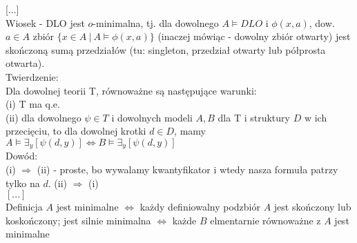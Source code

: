 \documentclass{article}
\begin{document}
[...]\\

Wiosek - DLO jest $o$-minimalna, tj. dla dowolnego $A\models DLO$ i $\phi(x,a)$, dow. $a\in A$ zbiór $\{x\in A\ |\ A\models \phi(x,a)\}$ (inaczej mówiąc - dowolny zbiór otwarty) jest skończoną sumą przedziałów (tu: singleton, przedział otwarty lub półprosta otwarta).
\\



Twierdzenie:\\
Dla dowolnej teorii T, równoważne są następujące warunki:\\
(i) T ma q.e.\\
(ii) dla dowolnego $\psi\in T$ i dowolnych modeli $A,B$ dla T i struktury $D$ w ich przecięciu, to dla dowolnej krotki $d\in D$, mamy $A\models\exists_{y}[\psi(d, y)]\iff B\models\exists_{y}[\psi(d, y)]$\\

Dowód:\\
(i) $\Rightarrow$ (ii) - proste, bo wywalamy kwantyfikator i wtedy nasza formuła patrzy tylko na $d$.
(ii) $\Rightarrow$ (i)\\
$[...]$\\



Definicja $A$ jest minimalne $\iff$ każdy definiowalny podzbiór $A$ jest skończony lub koskończony; jest silnie minimalna $\iff$ każde $B$ elmentarnie równoważne z $A$ jest minimalne
\end{document}
